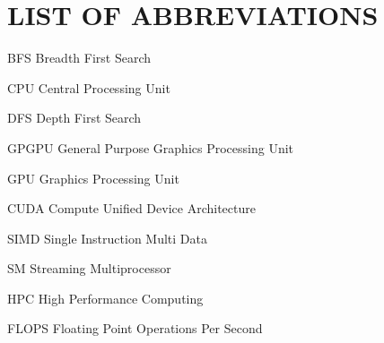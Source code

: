 \documentclass[draftthesis,tocnosub,noragright,centerchapter,12pt]{uiucecethesis09}
\begin{document}
\chapter{LIST OF ABBREVIATIONS}
\begin{symbollist*}
    \item[BFS] Breadth First Search
    \item[CPU] Central Processing Unit
    \item[DFS] Depth First Search
    \item[GPGPU] General Purpose Graphics Processing Unit
    \item[GPU] Graphics Processing Unit
    \item[CUDA] Compute Unified Device Architecture
    \item[SIMD] Single Instruction Multi Data
    \item[SM] Streaming Multiprocessor
    \item[HPC] High Performance Computing
    \item[FLOPS] Floating Point Operations Per Second
\end{symbollist*}


% 
%

\mainmatter

%










%
\appendix


\backmatter

%




\end{document}
